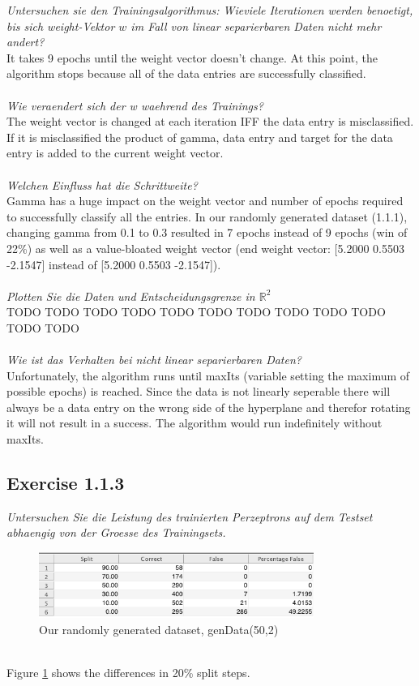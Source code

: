 \documentclass[12pt]{article}
\def\x#1#2{$\mathbb{#1}^#2$}
\def\n#1{\x#1}
\begin{document}
\textit{Untersuchen sie den Trainingsalgorithmus: Wieviele Iterationen werden benoetigt, bis sich weight-Vektor $w$ im Fall von linear separierbaren Daten nicht mehr andert?}
\\
It takes 9 epochs until the weight vector doesn't change. At this point, the algorithm stops because all of the data entries are successfully classified.
\\
\\
\textit{Wie veraendert sich der w waehrend des Trainings?}
\\
The weight vector is changed at each iteration IFF the data entry is misclassified. If it is misclassified the product of gamma, data entry and target for the data entry is added to the current weight vector.
\\
\\

\textit{Welchen Einfluss hat die Schrittweite?}
\\
Gamma has a huge impact on the weight vector and number of epochs required to successfully classify all the entries. In our randomly generated dataset (1.1.1), changing gamma from 0.1 to 0.3 resulted in 7 epochs instead of 9 epochs (win of 22\%) as well as a value-bloated weight vector (end weight vector:  [5.2000 0.5503 -2.1547] instead of [5.2000 0.5503 -2.1547]).
\\
\\


\textit{Plotten Sie die Daten und Entscheidungsgrenze in \n{R2}}
\\
TODO TODO TODO TODO TODO TODO TODO TODO TODO TODO TODO TODO
\\
\\

\textit{Wie ist das Verhalten bei nicht linear separierbaren Daten?}
\\
Unfortunately, the algorithm runs until maxIts (variable setting the maximum of possible epochs) is reached. Since the data is not linearly seperable there will always be a data entry on the wrong side of the hyperplane and therefor rotating it will not result in a success. The algorithm would run indefinitely without maxIts. 

\subsection{Exercise 1.1.3}
\textit{Untersuchen Sie die Leistung des trainierten Perzeptrons auf dem Testset abhaengig von der Groesse des Trainingsets.}
\\
\begin{figure}[htp]
	\centering
	\includegraphics[width=0.8\textwidth]{ab1_1_3}
	\caption{Our randomly generated dataset, genData(50,2)}
	\label{fig:diff}
\end{figure}
\\
Figure \ref{fig:diff} shows the differences in 20\% split steps.
\\
\end{document}

